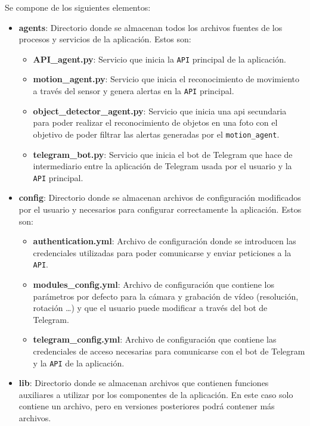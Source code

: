 Se compone de los siguientes elementos:

\vspace{-0.5cm}

\begin{itemize}
\item \textbf{agents}: Directorio donde se almacenan todos los archivos fuentes de los procesos y servicios de la aplicación. Estos son:

	\begin{itemize}
	\item \textbf{API\_agent.py}: Servicio que inicia la \texttt{API} principal de la aplicación.
	\item \textbf{motion\_agent.py}: Servicio que inicia el reconocimiento de movimiento a través del sensor y genera alertas en la \texttt{API} principal.
	\item \textbf{object\_detector\_agent.py}: Servicio que inicia una api secundaria para poder realizar el reconocimiento de objetos en una foto con el objetivo de poder filtrar las alertas generadas por el \texttt{motion\_agent}.
	\item \textbf{telegram\_bot.py}: Servicio que inicia el bot de Telegram que hace de intermediario entre la aplicación de Telegram usada por el usuario y la \texttt{API} principal.
	\end{itemize}

\item \textbf{config}: Directorio donde se almacenan archivos de configuración modificados por el usuario y necesarios para configurar correctamente la aplicación. Estos son:

	\begin{itemize}
	\item \textbf{authentication.yml}: Archivo de configuración donde se introducen las credenciales utilizadas para poder comunicarse y enviar peticiones a la \texttt{API}.
	\item \textbf{modules\_config.yml}: Archivo de configuración que contiene los parámetros por defecto para la cámara y grabación de vídeo (resolución, rotación \ldots) y que el usuario puede modificar a través del bot de Telegram.
	\item \textbf{telegram\_config.yml}: Archivo de configuración que contiene las credenciales de acceso necesarias para comunicarse con el bot de Telegram y la \texttt{API} de la aplicación.
	\end{itemize}

\item \textbf{lib}: Directorio donde se almacenan archivos que contienen funciones auxiliares a utilizar por los componentes de la aplicación. En este caso solo contiene un archivo, pero en versiones posteriores podrá contener más archivos.


\end{itemize}
